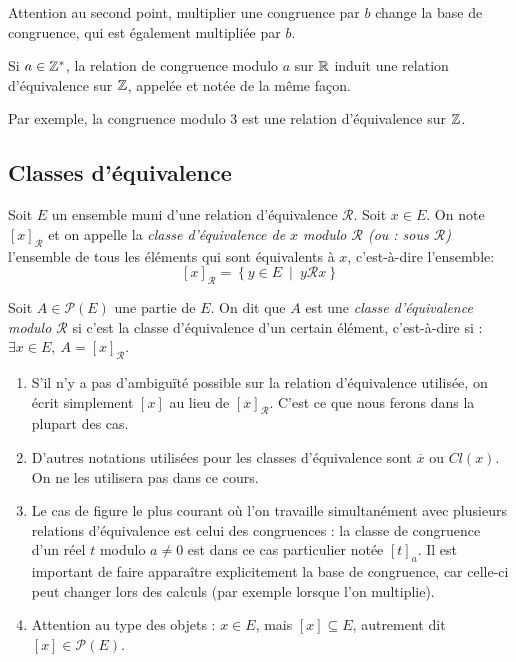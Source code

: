 \begin{remarque}
Attention au second point, multiplier une congruence par $b$ change la base de congruence, qui est également multipliée par $b$.
\end{remarque}

\begin{definition}
Si $a\in \mathbb{Z}^*$, la relation de congruence modulo $a$ sur $\mathbb{R}$ induit une relation d'équivalence sur $\mathbb{Z}$, appelée et notée de la même façon.
\end{definition}

Par exemple, la congruence modulo $3$ est une relation d'équivalence sur $\mathbb{Z}$.

\subsection{Classes d'équivalence}
\begin{definition}
Soit $E$ un ensemble muni d'une relation d'équivalence ${\mathcal R}$. Soit $x\in E$. On note $[x]_{\mathcal R}$  et on appelle la \emph{classe d'équivalence de $x$ modulo $\mathcal R$ (ou : sous $\mathcal R$)} l'ensemble  de tous les éléments qui sont équivalents à $x$, c'est-à-dire l'ensemble:
\[
[x]_{\mathcal R} = \left\{y\in E\:\mid\: y{\mathcal R}x\right\}
\]


Soit $A\in \mathcal P(E)$ une partie de $E$. On dit que $A$ est une \emph{classe d'équivalence modulo $\mathcal R$} si c'est la classe d'équivalence d'un certain élément, c'est-à-dire si : $\exists x\in E, \: A=[x]_{\mathcal R}$.
\end{definition}
\begin{remarque}
\begin{enumerate}
\item S'il n'y a pas d'ambiguïté possible sur la relation d'équivalence utilisée, on écrit simplement $[x]$ au lieu de $[x]_{\mathcal R}$. C'est ce que nous ferons dans la plupart des cas. 
\item D'autres notations utilisées pour les classes d'équivalence sont $\overline{x}$ ou $Cl(x)$. On ne les utilisera pas dans ce cours.
\item Le cas de figure le plus courant où l'on travaille simultanément avec plusieurs relations d'équivalence est celui des congruences : la classe de congruence d'un réel $t$ modulo $a\neq 0$ est dans ce cas particulier notée $[t]_a$. Il est important de faire apparaître explicitement la base de congruence, car celle-ci peut changer lors des calculs (par exemple lorsque l'on multiplie).
\item Attention au type des objets : $x \in E$, mais $[x] \subseteq E$, autrement dit $[x] \in \mathcal P(E)$.
\end{enumerate}
\end{remarque}
